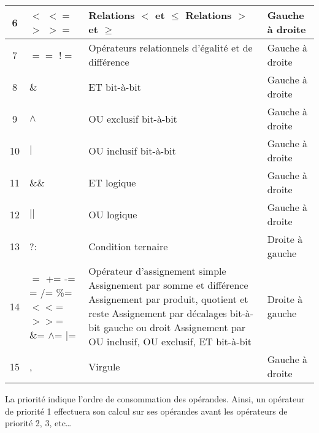 \documentclass[../../../main.tex]{subfiles}
\begin{document}
\begin{center}
\begin{tabular}{|c|p{}|p{}|l|}
\hline
6 & $<$ $<=$ \newline $>$ $>=$ & Relations $<$ et $\leq$ \newline Relations $>$ et $\geq$ & Gauche à droite \\
\hline
7 & $==$ $!=$ & Opérateurs relationnels d'égalité et de différence & Gauche à droite \\
\hline
8 & \& & ET bit-à-bit & Gauche à droite \\
\hline
9 & $\wedge$ & OU exclusif bit-à-bit & Gauche à droite \\
\hline
10 & $|$ & OU inclusif bit-à-bit & Gauche à droite \\
\hline
11 & \&\& & ET logique & Gauche à droite \\
\hline
12 & $||$ & OU logique & Gauche à droite \\
\hline
13 & ?: & Condition ternaire & Droite à gauche \\
\hline
14 & $=$ \newline += -= \newline *= /= \%= \newline $<<$= $>>$= \&= $\wedge$= $|$= & Opérateur d'assignement simple \newline Assignement par somme et différence \newline Assignement par produit, quotient et reste \newline Assignement par décalages bit-à-bit gauche ou droit \newline Assignement par OU inclusif, OU exclusif, ET bit-à-bit & Droite à gauche\\
\hline
15 & , & Virgule & Gauche à droite\\
\hline
\end{tabular}
\end{center}
La priorité indique l'ordre de consommation des opérandes. Ainsi, un opérateur de priorité 1 effectuera son calcul sur ses opérandes avant les opérateurs de priorité 2, 3, etc\dots
\end{document}
